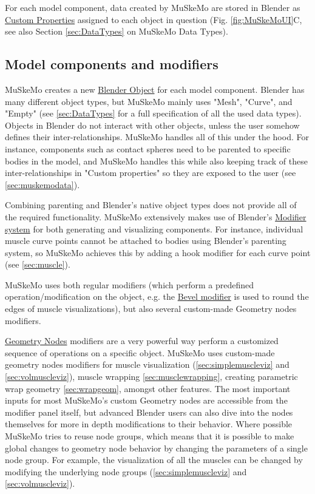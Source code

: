 \documentclass{article}
\begin{document}
For each model component, data created by MuSkeMo are stored in Blender as \href{https://docs.blender.org/manual/en/latest/files/custom_properties.html}{Custom Properties} assigned to each object in question (Fig. \ref{fig:MuSkeMoUI}C, see also Section \ref{sec:DataTypes} on MuSkeMo Data Types).

\subsection{Model components and modifiers}

MuSkeMo creates a new \href{https://docs.blender.org/manual/en/latest/scene_layout/object/types.html}{Blender Object} for each model component. Blender has many different object types, but MuSkeMo mainly uses "Mesh", "Curve", and "Empty" (see \ref{sec:DataTypes} for a full specification of all the used data types). Objects in Blender do not interact with other objects, unless the user somehow defines their inter-relationships. MuSkeMo handles all of this under the hood. For instance, components such as contact spheres need to be parented to specific bodies in the model, and MuSkeMo handles this while also keeping track of these inter-relationships in "Custom properties" so they are exposed to the user (see \ref{sec:muskemodata}).

\label{sec:modifiers}
Combining parenting and Blender's native object types does not provide all of the required functionality. MuSkeMo extensively makes use of Blender's \href{https://docs.blender.org/manual/en/latest/modeling/modifiers/index.html}{Modifier system} for both generating and visualizing components. For instance, individual muscle curve points cannot be attached to bodies using Blender's parenting system, so MuSkeMo achieves this by adding a hook modifier for each curve point (see \ref{sec:muscle}). 

MuSkeMo uses both regular modifiers (which perform a predefined operation/modification on the object, e.g. the \href{https://docs.blender.org/manual/en/latest/modeling/modifiers/generate/bevel.html}{Bevel modifier} is used to round the edges of muscle visualizations), but also several custom-made Geometry nodes modifiers.

\href{https://docs.blender.org/manual/en/latest/modeling/geometry_nodes/index.html}{Geometry Nodes} modifiers are a very powerful way perform a customized sequence of operations on a specific object. MuSkeMo uses custom-made geometry nodes modifiers for muscle visualization (\ref{sec:simplemuscleviz} and \ref{sec:volmuscleviz}), muscle wrapping \ref{sec:musclewrapping}, creating parametric wrap geometry \ref{sec:wrapgeom}, amongst other features. The most important inputs for most MuSkeMo's custom Geometry nodes are accessible from the modifier panel itself, but advanced Blender users can also dive into the nodes themselves for more in depth modifications to their behavior. Where possible MuSkeMo tries to reuse node groups, which means that it is possible to make global changes to geometry node behavior by changing the parameters of a single node group. For example, the visualization of all the muscles can be changed by modifying the underlying node groups (\ref{sec:simplemuscleviz} and \ref{sec:volmuscleviz}).
\end{document}
